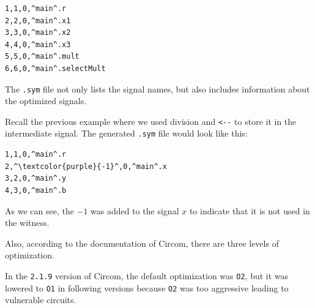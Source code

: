 \documentclass[../../book.tex]{subfiles}
\begin{document}
\begin{center}
    \begin{tcolorbox}[enhanced,
        width=0.5\textwidth,
        title=\textbf{.sym file for $x_1? \; x_2 \times x_3: x_2+x_3$},
        coltitle=gray!25!black,
        attach boxed title to top center={yshift=-2mm,yshifttext=-1mm},
        boxed title style={size=small,colframe=gray!75!black,
        colback=blue!30!white,boxrule=1pt},
        top=-0.35cm,
        bottom=-0.35cm]
        \begin{lstlisting}[language=Circom,numbers=none,basicstyle=\ttfamily\footnotesize,escapechar=^]
1,1,0,^main^.r
2,2,0,^main^.x1
3,3,0,^main^.x2
4,4,0,^main^.x3
5,5,0,^main^.mult
6,6,0,^main^.selectMult
        \end{lstlisting}
    \end{tcolorbox}
\end{center}

The \texttt{.sym} file not only lists the signal names, but also includes information about the optimized signals.

Recall the previous example where we used division and \texttt{<-{-}} to store it in the intermediate signal.
The generated \texttt{.sym} file would look like this:

\begin{center}
    \begin{tcolorbox}[enhanced,
        width=0.5\textwidth,
        title=\textbf{.sym file for $b \;\texttt{<-{-}}\; x/y, r \;\texttt{<==}\; by$},
        coltitle=gray!25!black,
        attach boxed title to top center={yshift=-2mm,yshifttext=-1mm},
        boxed title style={size=small,colframe=gray!75!black,
        colback=blue!30!white,boxrule=1pt},
        top=-0.35cm,
        bottom=-0.35cm]
        \begin{lstlisting}[language=Circom,numbers=none,basicstyle=\ttfamily\footnotesize,escapechar=^]
1,1,0,^main^.r
2,^\textcolor{purple}{-1}^,0,^main^.x
3,2,0,^main^.y
4,3,0,^main^.b
        \end{lstlisting}
    \end{tcolorbox}
\end{center}

As we can see, the $-1$ was added to the signal $x$ to indicate that it is not used in the witness.

Also, according to the documentation of Circom, there are three levels of optimization.

In the \texttt{2.1.9} version of Circom, the default optimization was \texttt{O2}, but it was lowered to \texttt{O1} in following versions because \texttt{O2} was too aggressive leading to vulnerable circuits.
\end{document}
